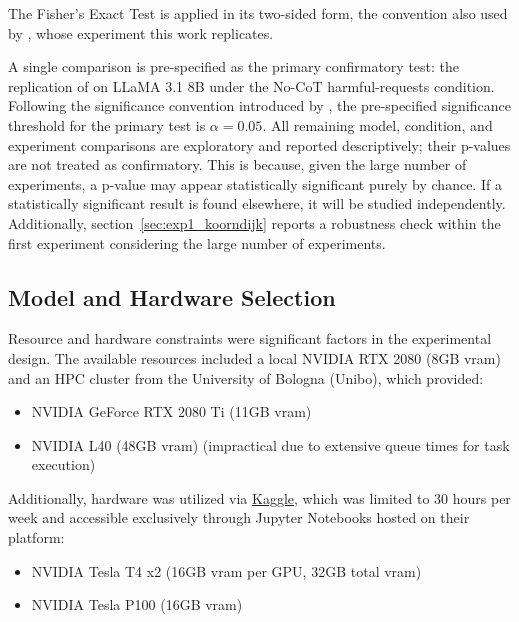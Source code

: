     
    The Fisher's Exact Test is applied in its two-sided form, the convention also used by \citeauthor{koorndijk_empirical_2025}, whose experiment this work replicates.
    

    
    A single comparison is pre-specified as the primary confirmatory test: the replication of \citeauthor{koorndijk_empirical_2025} \cite{koorndijk_empirical_2025} on LLaMA 3.1 8B under the No-CoT harmful-requests condition. Following the significance convention introduced by \citeauthor{fisher1935design} \cite{fisher1935design}, the pre-specified significance threshold for the primary test is $\alpha = 0.05$. All remaining model, condition, and experiment comparisons are exploratory and reported descriptively; their p-values are not treated as confirmatory. 
    This is because, given the large number of experiments, a p-value may appear statistically significant purely by chance. If a statistically significant result is found elsewhere, it will be studied independently. Additionally, section~\ref{sec:exp1_koorndijk} reports a \citeauthor{bonferroni1936teoria} robustness check within the first experiment considering the large number of experiments.
    

    \subsection*{Model and Hardware Selection}

    Resource and hardware constraints were significant factors in the experimental design. The available resources included a local NVIDIA RTX 2080 (8GB \gls{vram}) and an HPC cluster from the University of Bologna (Unibo), which provided:
    \begin{itemize}
        \item NVIDIA GeForce RTX 2080 Ti (11GB \gls{vram})
        \item NVIDIA L40 (48GB \gls{vram}) (impractical due to extensive queue times for task execution)
    \end{itemize}

    Additionally, hardware was utilized via \href{https://www.kaggle.com/}{Kaggle}, which was limited to 30 hours per week and accessible exclusively through Jupyter Notebooks hosted on their platform:
    \begin{itemize}
        \item NVIDIA Tesla T4 x2 (16GB \gls{vram} per GPU, 32GB total \gls{vram})
        \item NVIDIA Tesla P100 (16GB \gls{vram})
    \end{itemize}

